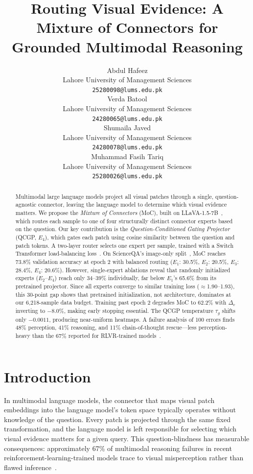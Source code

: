 \documentclass{article}
\title{Routing Visual Evidence: A Mixture of Connectors for Grounded Multimodal Reasoning}
\author{%
  Abdul Hafeez \\
  Lahore University of Management Sciences \\
  \texttt{25280098@lums.edu.pk} \\
  \And
  Verda Batool \\
  Lahore University of Management Sciences \\
  \texttt{24280065@lums.edu.pk} \\
  \And
  Shumaila Javed \\
  Lahore University of Management Sciences \\
  \texttt{24280078@lums.edu.pk} \\
  \And
  Muhammad Fasih Tariq \\
  Lahore University of Management Sciences \\
  \texttt{25280026@lums.edu.pk} \\
}
\begin{document}
\maketitle

\begin{abstract}
Multimodal large language models project all visual patches through a single, question-agnostic connector, leaving the language model to determine which visual evidence matters. We propose the \emph{Mixture of Connectors} (MoC), built on LLaVA-1.5-7B~\citep{liu2024llava}, which routes each sample to one of four structurally distinct connector experts based on the question. Our key contribution is the \emph{Question-Conditioned Gating Projector} (QCGP, $E_4$), which gates each patch using cosine similarity between the question and patch tokens. A two-layer router selects one expert per sample, trained with a Switch Transformer load-balancing loss~\citep{fedus2022switch}. On ScienceQA's image-only split~\citep{lu2022scienceqa}, MoC reaches 73.8\% validation accuracy at epoch 2 with balanced routing ($E_1$: 30.5\%, $E_2$: 20.5\%, $E_3$: 28.4\%, $E_4$: 20.6\%). However, single-expert ablations reveal that randomly initialized experts ($E_2$--$E_4$) reach only 34--39\% individually, far below $E_1$'s 65.6\% from its pretrained projector. Since all experts converge to similar training loss ($\approx$1.90--1.93), this 30-point gap shows that pretrained initialization, not architecture, dominates at our 6{,}218-sample data budget. Training past epoch 2 degrades MoC to 62.2\% with $\Delta_v$ inverting to $-8.0\%$, making early stopping essential. The QCGP temperature $\tau_g$ shifts only $-0.0011$, producing near-uniform heatmaps. A failure analysis of 100 errors finds 48\% perception, 41\% reasoning, and 11\% chain-of-thought rescue---less perception-heavy than the 67\% reported for RLVR-trained models~\citep{wang2026papo}.

\end{abstract}

\section{Introduction}
\label{sec:intro}

In multimodal language models, the connector that maps visual patch embeddings into the language model's token space typically operates without knowledge of the question. Every patch is projected through the same fixed transformation, and the language model is left responsible for selecting which visual evidence matters for a given query. This question-blindness has measurable consequences: approximately 67\% of multimodal reasoning failures in recent reinforcement-learning-trained models trace to visual misperception rather than flawed inference~\citep{wang2026papo}.
\end{document}
